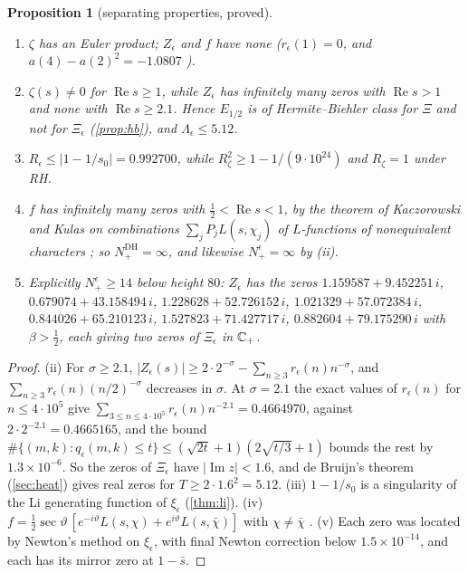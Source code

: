 \documentclass[11pt]{article}
\newtheorem{proposition}[theorem]{Proposition}
\theoremstyle{definition}\newtheorem{definition}[theorem]{Definition}
\theoremstyle{remark}\newtheorem{remark}[theorem]{Remark}
\renewcommand{\Re}{\operatorname{Re}}\renewcommand{\Im}{\operatorname{Im}}
\begin{document}
\begin{proposition}[separating properties, proved]\label{prop:sepproved}
\begin{enumerate}[label=(\roman*)]
\item $\zeta$ has an Euler product; $Z_\epsilon$ and $f$ have none ($r_\epsilon(1)=0$, and $a(4)-a(2)^2=-1.0807$ \cite{S01}).
\item $\zeta(s)\ne0$ for $\Re s\ge1$, while $Z_\epsilon$ has infinitely many zeros with $\Re s>1$ \cite{DH} and none with $\Re s\ge2.1$. Hence $E_{1/2}$ is of Hermite--Biehler class for $\Xi$ and not for $\Xi_\epsilon$ (\cref{prop:hb}), and $\Lambda_\epsilon\le5.12$.
\item $R_\epsilon\le|1-1/s_0|=0.992700$, while $R_\zeta^2\ge1-1/(9\cdot10^{24})$ and $R_\zeta=1$ under RH.
\item $f$ has infinitely many zeros with $\frac12<\Re s<1$, by the theorem of Kaczorowski and Kulas on combinations $\sum_jP_jL(s,\chi_j)$ of $L$-functions of nonequivalent characters \cite{KK}; so $N_+^{\mathrm{DH}}=\infty$, and likewise $N_+^\epsilon=\infty$ by (ii).
\item Explicitly $N_+^\epsilon\ge14$ below height $80$: $Z_\epsilon$ has the zeros $1.159587+9.452251\,i$, $0.679074+43.158494\,i$, $1.228628+52.726152\,i$, $1.021329+57.072384\,i$, $0.844026+65.210123\,i$, $1.527823+71.427717\,i$, $0.882604+79.175290\,i$ with $\beta>\frac12$, each giving two zeros of $\Xi_\epsilon$ in $\mathbb C_+$.
\end{enumerate}
\end{proposition}
\begin{proof}
(ii) For $\sigma\ge2.1$, $|Z_\epsilon(s)|\ge2\cdot2^{-\sigma}-\sum_{n\ge3}r_\epsilon(n)n^{-\sigma}$, and $\sum_{n\ge3}r_\epsilon(n)(n/2)^{-\sigma}$ decreases in $\sigma$. At $\sigma=2.1$ the exact values of $r_\epsilon(n)$ for $n\le4\cdot10^5$ give $\sum_{3\le n\le4\cdot10^5}r_\epsilon(n)n^{-2.1}=0.4664970$, against $2\cdot2^{-2.1}=0.4665165$, and the bound $\#\{(m,k):q_\epsilon(m,k)\le t\}\le(\sqrt{2t}+1)(2\sqrt{t/3}+1)$ bounds the rest by $1.3\times10^{-6}$. So the zeros of $\Xi_\epsilon$ have $|\Im z|<1.6$, and de Bruijn's theorem (\cref{sec:heat}) gives real zeros for $T\ge2\cdot1.6^2=5.12$. (iii) $1-1/s_0$ is a singularity of the Li generating function of $\xi_\epsilon$ (\cref{thm:li}). (iv) $f=\frac12\sec\vartheta\,[e^{-i\vartheta}L(s,\chi)+e^{i\vartheta}L(s,\bar\chi)]$ with $\chi\ne\bar\chi$ \cite{S01}. (v) Each zero was located by Newton's method on $\xi_\epsilon$, with final Newton correction below $1.5\times10^{-14}$, and each has its mirror zero at $1-\bar s$.
\end{proof}
\end{document}

